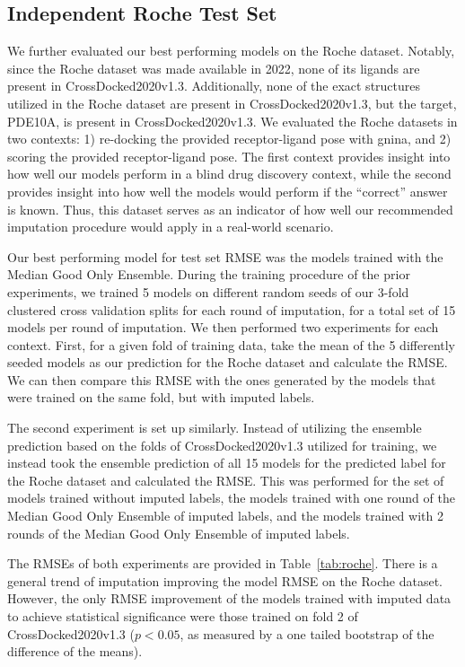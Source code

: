 \documentclass[journal=jcim,manuscript=article]{achemso}
\begin{document}
\subsection{Independent Roche Test Set}
We further evaluated our best performing models on the Roche dataset.
Notably, since the Roche dataset was made available in 2022, none of its ligands are present in CrossDocked2020v1.3.
Additionally, none of the exact structures utilized in the Roche dataset are present in CrossDocked2020v1.3, but the target, PDE10A, is present in CrossDocked2020v1.3.
We evaluated the Roche datasets in two contexts: 1) re-docking the provided receptor-ligand pose with gnina, and 2) scoring the provided receptor-ligand pose.
The first context provides insight into how well our models perform in a blind drug discovery context, while the second provides insight into how well the models would perform if the ``correct'' answer is known.
Thus, this dataset serves as an indicator of how well our recommended imputation procedure would apply in a real-world scenario.

Our best performing model for test set RMSE was the models trained with the Median Good Only Ensemble.
During the training procedure of the prior experiments, we trained 5 models on different random seeds of our 3-fold clustered cross validation splits for each round of imputation, for a total set of 15 models per round of imputation.
We then performed two experiments for each context.
First, for a given fold of training data, take the mean of the 5 differently seeded models as our prediction for the Roche dataset and calculate the RMSE.
We can then compare this RMSE with the ones generated by the models that were trained on the same fold, but with imputed labels.

The second experiment is set up similarly.
Instead of utilizing the ensemble prediction based on the folds of CrossDocked2020v1.3 utilized for training, we instead took the ensemble prediction of all 15 models for the predicted label for the Roche dataset and calculated the RMSE.
This was performed for the set of models trained without imputed labels, the models trained with one round of the Median Good Only Ensemble of imputed labels, and the models trained with 2 rounds of the Median Good Only Ensemble of imputed labels.

The RMSEs of both experiments are provided in Table~\ref{tab:roche}.
There is a general trend of imputation improving the model RMSE on the Roche dataset.
However, the only RMSE improvement of the models trained with imputed data to achieve statistical significance were those trained on fold 2 of CrossDocked2020v1.3 ($p<0.05$, as measured by a one tailed bootstrap of the difference of the means).
\end{document}
